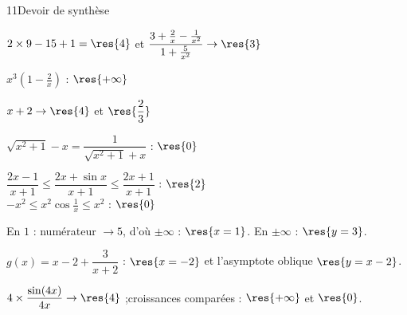 \begin{corrige}{11}{Devoir de synthèse}
\begin{deuxcolonnes}
\begin{questions}
  \item $2\times9-15+1=\res{4}$ et $\dfrac{3+\frac2x-\frac{1}{x^{2}}}{1+\frac{5}{x^{2}}}\to\res{3}$
  \item $x^{3}\left(1-\frac2x\right)$ : $\res{+\infty}$
\end{questions}
\begin{questions}[resume]
  \item $x+2\to\res{4}$ et $\res{\dfrac23}$
  \item $\sqrt{x^{2}+1}-x=\dfrac{1}{\sqrt{x^{2}+1}+x}$ : $\res{0}$
\end{questions}
\begin{questions}[resume]
  \item $\dfrac{2x-1}{x+1}\leq\dfrac{2x+\sin x}{x+1}\leq\dfrac{2x+1}{x+1}$ : $\res{2}$\\
    $-x^{2}\leq x^{2}\cos\frac1x\leq x^{2}$ : $\res{0}$
\end{questions}
\columnbreak
{}
\begin{questions}[resume]
  \item En $1$ : numérateur $\to5$, d'où $\pm\infty$ : $\res{x=1}$. En $\pm\infty$ : $\res{y=3}$.
  \item $g(x)=x-2+\dfrac{3}{x+2}$ : $\res{x=-2}$ et l'asymptote oblique $\res{y=x-2}$.
\end{questions}
\begin{questions}[resume]
  \item $4\times\dfrac{\sin(4x)}{4x}\to\res{4}$ ;\enspace croissances comparées : $\res{+\infty}$ et $\res{0}$.
\end{questions}
\end{deuxcolonnes}
\end{corrige}

